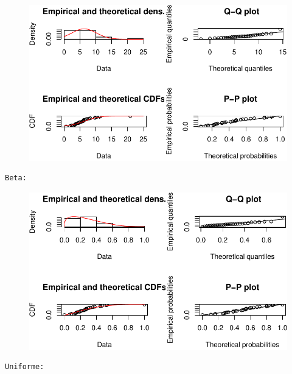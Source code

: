 \documentclass[
  letterpaper,
  DIV=11,
  numbers=noendperiod]{scrartcl}
\begin{document}
\begin{figure}[H]

{\centering \includegraphics{quiz5_files/figure-pdf/unnamed-chunk-31-5.pdf}

}

\end{figure}

\begin{verbatim}
Beta: 
\end{verbatim}

\begin{figure}[H]

{\centering \includegraphics{quiz5_files/figure-pdf/unnamed-chunk-31-6.pdf}

}

\end{figure}

\begin{verbatim}
Uniforme: 
\end{verbatim}
\end{document}
